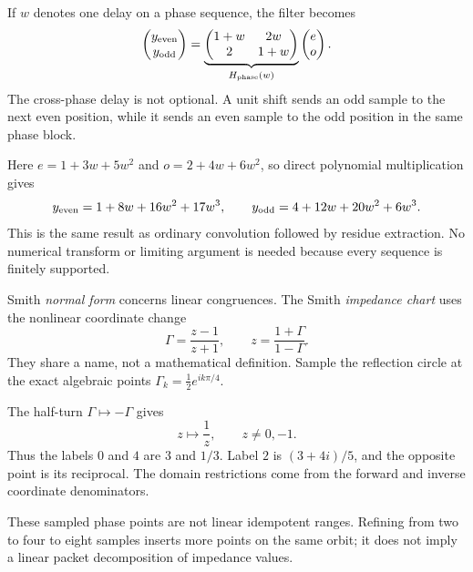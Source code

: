 If $w$ denotes one delay on a phase sequence, the filter becomes
\[
\begin{pmatrix}y_{\rm even}\\y_{\rm odd}\end{pmatrix}
=
\underbrace{\begin{pmatrix}1+w&2w\\2&1+w\end{pmatrix}}_{H_{\rm phase}(w)}
\begin{pmatrix}e\\o\end{pmatrix}.
\]
The cross-phase delay is not optional. A unit shift sends an odd sample to the next even position, while it sends an even sample to the odd position in the same phase block.

Here $e=1+3w+5w^2$ and $o=2+4w+6w^2$, so direct polynomial multiplication gives
\[
y_{\rm even}=1+8w+16w^2+17w^3,
\qquad
y_{\rm odd}=4+12w+20w^2+6w^3.
\]
This is the same result as ordinary convolution followed by residue extraction. No numerical transform or limiting argument is needed because every sequence is finitely supported.


Smith \emph{normal form} concerns linear congruences. The Smith \emph{impedance chart} uses the nonlinear coordinate change
\[
\Gamma=\frac{z-1}{z+1},\qquad z=\frac{1+\Gamma}{1-\Gamma}.
\]
They share a name, not a mathematical definition. Sample the reflection circle at the exact algebraic points $\Gamma_k=\tfrac12 e^{ik\pi/4}$.


The half-turn $\Gamma\mapsto-\Gamma$ gives
\[
z\longmapsto\frac1z,\qquad z\ne0,-1.
\]
Thus the labels $0$ and $4$ are $3$ and $1/3$. Label $2$ is $(3+4i)/5$, and the opposite point is its reciprocal. The domain restrictions come from the forward and inverse coordinate denominators.

These sampled phase points are not linear idempotent ranges. Refining from two to four to eight samples inserts more points on the same orbit; it does not imply a linear packet decomposition of impedance values.

